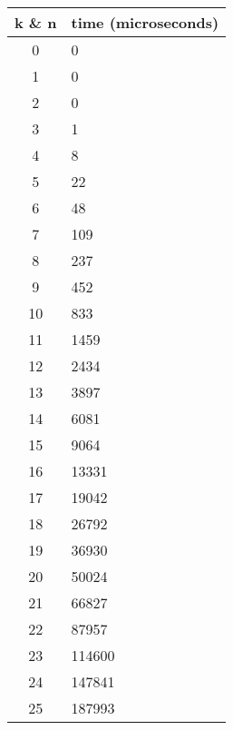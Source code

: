 \begin{figure}
	\begin{tabular}{| c | l |}
		\hline
		k \& n & time (microseconds)\\
		\hline
		0 & 0\\
		\hline
		1 & 0\\
		\hline
		2 & 0\\
		\hline
		3 & 1\\
		\hline
		4 & 8\\
		\hline
		5 & 22\\
		\hline
		6 & 48\\
		\hline
		7 & 109\\
		\hline
		8 & 237\\
		\hline
		9 & 452\\
		\hline
		10 & 833\\
		\hline
		11 & 1459\\
		\hline
		12 & 2434\\
		\hline
		13 & 3897\\
		\hline
		14 & 6081\\
		\hline
		15 & 9064\\
		\hline
		16 & 13331\\
		\hline
		17 & 19042\\
		\hline
		18 & 26792\\
		\hline
		19 & 36930\\
		\hline
		20 & 50024\\
		\hline
		21 & 66827\\
		\hline
		22 & 87957\\
		\hline
		23 & 114600\\
		\hline
		24 & 147841\\
		\hline
		25 & 187993\\
		\hline
	\end{tabular}
\end{figure}
